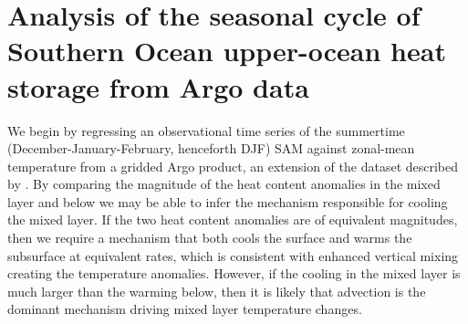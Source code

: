 \documentclass{ametsocV5}
\begin{document}




\section{Analysis of the seasonal cycle of Southern Ocean upper-ocean heat storage from Argo data} %
\label{sec:analysis_of_observations}



We begin by regressing an observational time series of the summertime (December-January-February, henceforth DJF) SAM \citep{Marshall2003a} against zonal-mean temperature from a gridded Argo product, an extension of the dataset described by \citet{Roemmich2009}. By comparing the magnitude of the heat content anomalies in the mixed layer and below we may be able to infer the mechanism responsible for cooling the mixed layer. If the two heat content anomalies are of equivalent magnitudes, then we require a mechanism that both cools the surface and warms the subsurface at equivalent rates, which is consistent with enhanced vertical mixing creating the temperature anomalies. However, if the cooling in the mixed layer is much larger than the warming below, then it is likely that advection is the dominant mechanism driving mixed layer temperature changes.
\end{document}
